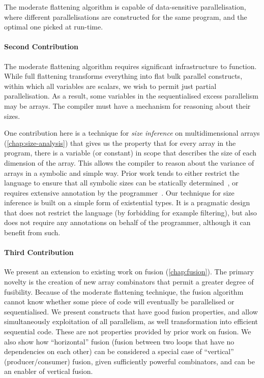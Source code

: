The moderate flattening algorithm is capable of data-sensitive
parallelisation, where different parallelisations are constructed for
the same program, and the optimal one picked at run-time.

\paragraph{Second Contribution}

The moderate flattening algorithm requires significant infrastructure
to function.  While full flattening transforms everything into flat
bulk parallel constructs, within which all variables are scalars, we
wish to permit just partial parallelisation.  As a result, some
variables in the sequentialised excess parallelism may be arrays.  The
compiler must have a mechanism for reasoning about their sizes.

One contribution here is a technique for \textit{size inference} on
multidimensional arrays (\cref{chap:size-analysis}) that gives us the
property that for every array in the program, there is a variable (or
constant) in scope that describes the size of each dimension of the
array.  This allows the compiler to reason about the variance of
arrays in a symbolic and simple way.  Prior work tends to either
restrict the language to ensure that all symbolic sizes can be
statically determined~\cite{fish}, or requires extensive annotation by
the programmer~\cite{brady2013idris,bove2009dependent}.  Our technique
for size inference is built on a simple form of existential types.  It
is a pragmatic design that does not restrict the language (by
forbidding for example filtering), but also does not require any
annotations on behalf of the programmer, although it can benefit from
such.

\paragraph{Third Contribution}

We present an extension to existing work on fusion
(\cref{chap:fusion}).  The primary novelty is the creation of new
array combinators that permit a greater degree of fusibility.  Because
of the moderate flattening technique, the fusion algorithm cannot know
whether some piece of code will eventually be parallelised or
sequentialised.  We present constructs that have good fusion
properties, and allow simultaneously exploitation of all parallelism,
as well transformation into efficient sequential code.  These are not
properties provided by prior work on fusion.  We also show how
``horizontal'' fusion (fusion between two loops that have no
dependencies on each other) can be considered a special case of
``vertical'' (producer/consumer) fusion, given sufficiently powerful
combinators, and can be an enabler of vertical fusion.

